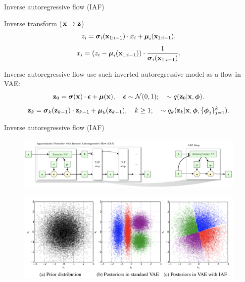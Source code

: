 \begin{frame}{Inverse autoregressive flow (IAF)}
	
	\begin{block}{Inverse transform ($\mathbf{x} \rightarrow \mathbf{z}$)}
		\vspace{-0.2cm}
		\[
		z_i = \boldsymbol{\sigma}_i (\mathbf{x}_{1:i-1}) \cdot x_i + \boldsymbol{\mu}_i(\mathbf{x}_{1:i-1}).
		\]
		\[
		x_i = \left( z_i - \boldsymbol{\mu}_i(\mathbf{x}_{1:i-1})\right) \cdot \frac{1}{\boldsymbol{\sigma}_i (\mathbf{x}_{1:i-1})}.
		\]
		\vspace{-0.3cm}
	\end{block}
	Inverse autoregressive flow use such inverted autoregressive model as a flow in VAE:
	\[
	\mathbf{z}_0 = \boldsymbol{\sigma}(\mathbf{x}) \cdot \boldsymbol{\epsilon} + \boldsymbol{\mu}(\mathbf{x}), \quad \boldsymbol{\epsilon} \sim \mathcal{N}(0, 1); \quad  \sim q(\mathbf{z}_0 | \mathbf{x}, \boldsymbol{\phi}).
	\]
	\[
	\mathbf{z}_k = \boldsymbol{\sigma}_k(\mathbf{z}_{k - 1}) \cdot \mathbf{z}_{k-1} + \boldsymbol{\mu}_k(\mathbf{z}_{k - 1}), \quad k \geq 1; \quad  \sim q_k(\mathbf{z}_k | \mathbf{x}, \boldsymbol{\phi}, \{\boldsymbol{\phi}_j\}_{j=1}^k).
	\]
	
\end{frame}
\begin{frame}{Inverse autoregressive flow (IAF)}
	\begin{figure}
		\includegraphics[width=\linewidth]{figs/iaf2.png}
	\end{figure}
	\begin{figure}
		\includegraphics[width=\linewidth]{figs/iaf1.png}
	\end{figure}

\end{frame}
